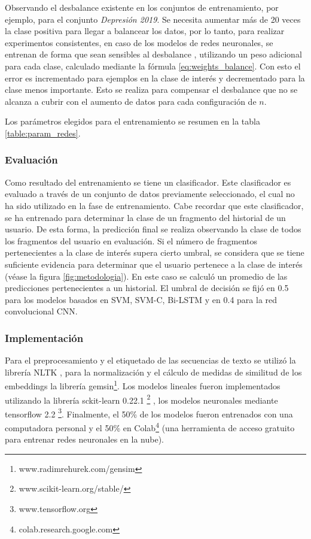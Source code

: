 Observando el desbalance existente en los conjuntos de entrenamiento, por ejemplo, para el conjunto \textit{Depresión 2019}. Se necesita aumentar más de 20 veces la clase positiva para llegar a balancear los datos, por lo tanto, para realizar experimentos consistentes, en caso de los modelos de redes neuronales, se entrenan de forma que sean sensibles al desbalance \citep{wang2016training}, utilizando un peso adicional para cada clase, calculado mediante la fórmula \ref{eq:weights_balance}. Con esto el error es incrementado para ejemplos en la clase de interés y decrementado para la clase menos importante. Esto se realiza para compensar el desbalance que no se alcanza a cubrir con el aumento de datos para cada configuración de $n$.

Los parámetros elegidos para el entrenamiento se resumen en la tabla \ref{table:param_redes}. 

\subsubsection{Evaluación}

Como resultado del entrenamiento se tiene un clasificador. Este clasificador es evaluado a través de un conjunto de datos previamente seleccionado, el cual no ha sido utilizado en la fase de entrenamiento. Cabe recordar que este clasificador, se ha entrenado para determinar la clase de un fragmento del historial de un usuario. De esta forma, la predicción final se realiza observando la clase de todos los fragmentos del usuario en evaluación. Si el número de fragmentos pertenecientes a la clase de interés supera cierto umbral, se considera que se tiene suficiente evidencia para determinar que el usuario pertenece a la clase de interés (véase la figura \ref{fig:metodologia}). En este caso se calculó un promedio de las predicciones pertenecientes a un historial. El umbral de decisión se fijó en 0.5 para los modelos basados en SVM, SVM-C, Bi-LSTM y en 0.4 para la red convolucional CNN. 



\subsubsection{Implementación}
Para el preprocesamiento y el etiquetado de las secuencias de texto se utilizó la librería NLTK \citep{loper2002nltk}, para la normalización y el cálculo de medidas de similitud de los embeddings la librería gemsin\footnote{www.radimrehurek.com/gensim}.
Los modelos lineales fueron implementados utilizando la librería sckit-learn 0.22.1 \footnote{www.scikit-learn.org/stable/} , los modelos neuronales mediante tensorflow 2.2 \footnote{www.tensorflow.org}. %
Finalmente, el 50\% de los modelos fueron entrenados con una computadora personal y el 50\% en Colab\footnote{colab.research.google.com} (una herramienta de acceso gratuito para entrenar redes neuronales en la nube).
